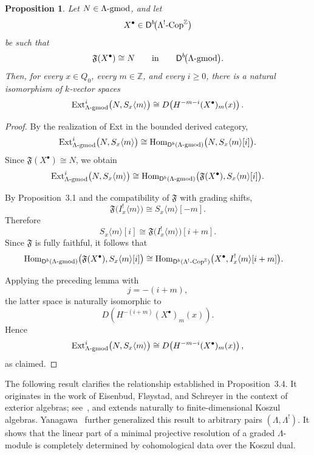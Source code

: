 \documentclass[11pt]{article}
\newtheorem{proposition}[theorem]{Proposition}
\theoremstyle{definition}
\theoremstyle{remark}
\begin{document}
\begin{proposition}
Let \(N\in\Lambda\textup{-}\mathrm{gmod}\), and let
\[
X^{\bullet}\in
\mathsf{D}^{b}\!\bigl(
\Lambda^{!}\textup{-}\mathrm{Cop}^{\mathbb{Z}}
\bigr)
\]
be such that
\[
\mathfrak{F}(X^{\bullet})\cong N
\qquad\text{in}\qquad
\mathsf{D}^{b}\!\bigl(
\Lambda\textup{-}\mathrm{gmod}
\bigr).
\]
Then, for every \(x\in Q_0\), every \(m\in\mathbb Z\), and every
\(i\geq0\), there is a natural isomorphism of \(k\)-vector spaces
\[
\operatorname{Ext}^{i}_{\Lambda\textup{-}\mathrm{gmod}}
\bigl(N,S_x\langle m\rangle\bigr)
\cong
D\!\left(
H^{-m-i}(X^{\bullet})_m(x)
\right).
\]
\end{proposition}
 \begin{proof}
By the realization of Ext in the bounded derived category,
\[
\operatorname{Ext}^{i}_{\Lambda\textup{-}\mathrm{gmod}}
\bigl(N,S_x\langle m\rangle\bigr)
\cong
\operatorname{Hom}_{\mathsf{D}^{b}
(\Lambda\textup{-}\mathrm{gmod})}
\bigl(N,S_x\langle m\rangle[i]\bigr).
\]
Since
\(\mathfrak{F}(X^{\bullet})\cong N\), we obtain
\[
\operatorname{Ext}^{i}_{\Lambda\textup{-}\mathrm{gmod}}
\bigl(N,S_x\langle m\rangle\bigr)
\cong
\operatorname{Hom}_{\mathsf{D}^{b}
(\Lambda\textup{-}\mathrm{gmod})}
\bigl(
\mathfrak{F}(X^{\bullet}),
S_x\langle m\rangle[i]
\bigr).
\]

By Proposition~3.1 and the compatibility of \(\mathfrak{F}\) with grading
shifts,
\[
\mathfrak{F}\bigl(I_x^{!}\langle m\rangle\bigr)
\cong
S_x\langle m\rangle[-m].
\]
Therefore
\[
S_x\langle m\rangle[i]
\cong
\mathfrak{F}\bigl(I_x^{!}\langle m\rangle\bigr)[i+m].
\]
Since \(\mathfrak{F}\) is fully faithful, it follows that
\[
\begin{aligned}
\operatorname{Hom}_{\mathsf{D}^{b}
(\Lambda\textup{-}\mathrm{gmod})}
\bigl(
\mathfrak{F}(X^{\bullet}),
S_x\langle m\rangle[i]
\bigr)
&\cong
\operatorname{Hom}_{\mathsf{D}^{b}
(\Lambda^{!}\textup{-}\mathrm{Cop}^{\mathbb{Z}})}
\bigl(
X^{\bullet},
I_x^{!}\langle m\rangle[i+m]
\bigr).
\end{aligned}
\]

Applying the preceding lemma with
\[
j=-(i+m),
\]
the latter space is naturally isomorphic to
\[
D\!\left(
H^{-(i+m)}(X^{\bullet})_m(x)
\right).
\]
Hence
\[
\operatorname{Ext}^{i}_{\Lambda\textup{-}\mathrm{gmod}}
\bigl(N,S_x\langle m\rangle\bigr)
\cong
D\!\left(
H^{-m-i}(X^{\bullet})_m(x)
\right),
\]
as claimed.
\end{proof}
The following result clarifies the relationship established in Proposition~3.4. It originates in the work of Eisenbud, Fl{\o}ystad, and Schreyer in the context of exterior algebras; see~\cite[Corollary~3.6]{11}, and extends naturally to finite-dimensional Koszul algebras. Yanagawa~\cite[Theorem~3.9]{26} further generalized this result to arbitrary pairs \((\Lambda,\Lambda^{!})\). It shows that the linear part of a minimal projective resolution of a graded \(\Lambda\)-module is completely determined by cohomological data over the Koszul dual.
\end{document}
